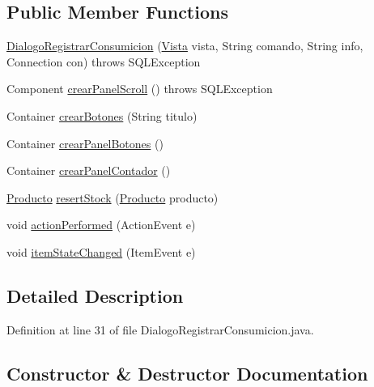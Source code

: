 \subsection*{Public Member Functions}
\begin{DoxyCompactItemize}
\item 
\mbox{\hyperlink{classsociedad2_1_1_dialogo_registrar_consumicion_a259e56e9b3494e7d1fc134370ec362dd}{Dialogo\+Registrar\+Consumicion}} (\mbox{\hyperlink{classsociedad2_1_1_vista}{Vista}} vista, String comando, String info, Connection con)  throws S\+Q\+L\+Exception 
\item 
Component \mbox{\hyperlink{classsociedad2_1_1_dialogo_registrar_consumicion_a03abf39f1f7ad719daf309e2507e8fe2}{crear\+Panel\+Scroll}} ()  throws S\+Q\+L\+Exception 
\item 
Container \mbox{\hyperlink{classsociedad2_1_1_dialogo_registrar_consumicion_a5b6ab708bcc0b27ef9a3ffcb557e4356}{crear\+Botones}} (String titulo)
\item 
Container \mbox{\hyperlink{classsociedad2_1_1_dialogo_registrar_consumicion_a5597a3fa2f6b7e7a6b6c1c4893b2875a}{crear\+Panel\+Botones}} ()
\item 
Container \mbox{\hyperlink{classsociedad2_1_1_dialogo_registrar_consumicion_a13951c3941ceda5aca796fea7d93d6d4}{crear\+Panel\+Contador}} ()
\item 
\mbox{\hyperlink{classsociedad2_1_1_producto}{Producto}} \mbox{\hyperlink{classsociedad2_1_1_dialogo_registrar_consumicion_a59a8cdd15d8fe30b30d0f11df3b68b8d}{resert\+Stock}} (\mbox{\hyperlink{classsociedad2_1_1_producto}{Producto}} producto)
\item 
void \mbox{\hyperlink{classsociedad2_1_1_dialogo_registrar_consumicion_a0910cb6ece7188ee98dc8c972f0c453a}{action\+Performed}} (Action\+Event e)
\item 
void \mbox{\hyperlink{classsociedad2_1_1_dialogo_registrar_consumicion_a136409604ab04264d7a00dd5bf4752af}{item\+State\+Changed}} (Item\+Event e)
\end{DoxyCompactItemize}


\subsection{Detailed Description}


Definition at line 31 of file Dialogo\+Registrar\+Consumicion.\+java.



\subsection{Constructor \& Destructor Documentation}
\mbox{\label{classsociedad2_1_1_dialogo_registrar_consumicion_a259e56e9b3494e7d1fc134370ec362dd}} 
